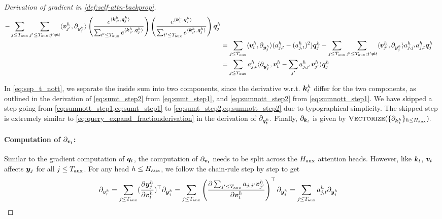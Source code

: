 \begin{proof}[Derivation of gradient in \cref{def:self-attn-backprop}]
\begin{align}
 - \sum_{ j \le T_{\text{aux}} } \sum_{ j' \le T_{\text{aux}}; j' \ne t } \langle {\bm{v}}_{j'}^h, \partial_{{\bm{y}}_{j}^h}  \rangle \left( \frac{ e^{ \langle {\bm{k}}_{j'}^h, {\bm{q}}_j^h \rangle } }{ \sum_{t' \le T_{\text{aux}}} e^{ \langle {\bm{k}}_{t'}^h, {\bm{q}}_j^h \rangle } }  \right) \left( \frac{ e^{ \langle {\bm{k}}_t^h, {\bm{q}}_j^h \rangle } }{ \sum_{t' \le T_{\text{aux}}} e^{ \langle {\bm{k}}_{t'}^h, {\bm{q}}_j^h \rangle } }  \right) {\bm{q}}_j^h  \label{eq:sumnott_step2}\\&
 = \sum_{ j \le T_{\text{aux}} } \langle {\bm{v}}_t^h, \partial_{{\bm{y}}_{j}^h} \rangle ( a^h_{j, t} - (a^h_{j, t})^2  ) {\bm{q}}_j^h - \sum_{ j \le T_{\text{aux}} } \sum_{ j' \le T_{\text{aux}}; j' \ne t } \langle {\bm{v}}_{j'}^h, \partial_{{\bm{y}}_{j}^h}  \rangle a^h_{j, j'} a^h_{j, t} {\bm{q}}_j^h  \nonumber\\&
 = \sum_{ j \le T_{\text{aux}} }  a^h_{j, t}   \langle \partial_{{\bm{y}}_j^h},  {\bm{v}}^{h}_t - \sum_{j'} a^h_{j, j'} {\bm{v}}^{h}_{j'} \rangle   {\bm{q}}^{h}_{j}  \nonumber
    \end{align}
    \endgroup

In \cref{eq:sep_t_nott}, we separate the inside sum into two components, since the derivative w.r.t. ${\bm{k}}_t^h$ differ for the two components, as outlined in the derivation of \cref{eq:sumt_step2} from \cref{eq:sumt_step1}, and \cref{eq:sumnott_step2} from \cref{eq:sumnott_step1}. We have skipped a step going from  \cref{eq:sumnott_step1,eq:sumt_step1} to  \cref{eq:sumt_step2,eq:sumnott_step2} due to typographical simplicity. The skipped step is extremely similar to \cref{eq:query_expand_fractionderivation} in the derivation of $\partial_{{\bm{q}}_t^h}.$ Finally, $\partial_{{\bm{k}}_t}$ is given by $\textsc{Vectorize}(\{ \partial_{ {\bm{k}}_t^h } \}_{ h \le H_{\text{aux}} } ).$
    


\paragraph{Computation of $ \partial_{{\bm{v}}_t}$:} Similar to the gradient computation of ${\bm{q}}_t$, the computation of $ \partial_{{\bm{v}}_t} $ needs to be split across the $H_{\text{aux}}$ attention heads. However, like ${\bm{k}}_t$, ${\bm{v}}_t$ affects ${\bm{y}}_j$ for all $j \le T_{\text{aux}}$. For any head $h \le H_{\text{aux}}$, we follow the chain-rule step by step to get
\begin{align*}
    \partial_{{\bm{v}}_t^h} &= \sum_{ j \le T_{\text{aux}} } ( \frac{ \partial {\bm{y}}_{j}^h }{ \partial {\bm{v}}_t^h } )^{\top} \partial_{{\bm{y}}_j^h}  = \sum_{ j \le T_{\text{aux}} } \left( \frac{ \partial \sum_{j' \le T_{\text{aux}}} a_{j, j'} {\bm{v}}_{j'}^h  }{ \partial {\bm{v}}_t^h } \right)^{\top} \partial_{{\bm{y}}_j^h} 
    = \sum_{ j \le T_{\text{aux}} } a_{j, t}^h \partial_{{\bm{y}}_j^h}
\end{align*}


\end{proof}





